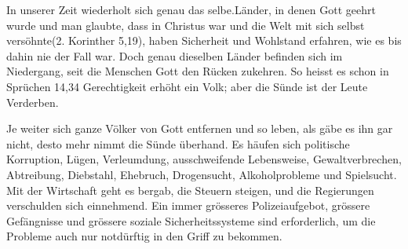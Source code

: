 \documentclass{../inc/mybib}
\begin{document}
In unserer Zeit wiederholt sich genau das selbe.Länder, in denen Gott geehrt wurde und man glaubte, dass \flqqGott in Christus war und die Welt mit sich selbst versöhnte\frqq{}(2. Korinther 5,19), haben Sicherheit und Wohlstand erfahren, wie es bis dahin nie der Fall war. Doch genau dieselben Länder befinden sich im Niedergang, seit die Menschen Gott den Rücken zukehren. So heisst es schon in Sprüchen 14,34 \flqq Gerechtigkeit erhöht ein Volk; aber die Sünde ist der Leute Verderben.\frqq

Je weiter sich ganze Völker von Gott entfernen und so leben, als gäbe es ihn gar nicht, desto mehr nimmt die Sünde überhand. Es häufen sich politische Korruption, Lügen, Verleumdung, ausschweifende Lebensweise, Gewaltverbrechen, Abtreibung, Diebstahl, Ehebruch, Drogensucht, Alkoholprobleme und Spielsucht. Mit der Wirtschaft geht es bergab, die Steuern steigen, und die Regierungen verschulden sich einnehmend. Ein immer grösseres Polizeiaufgebot, grössere Gefängnisse und grössere soziale Sicherheitssysteme sind erforderlich, um die Probleme auch nur notdürftig in den Griff zu bekommen.
\end{document}
